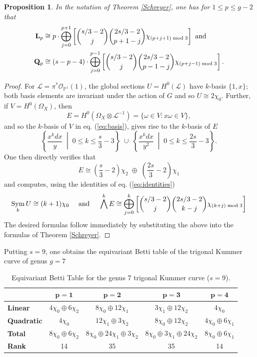 \documentclass[10pt]{amsart}
\newtheorem{proposition}[theorem]{Proposition}
\theoremstyle{definition}
\newcommand{\cO}{\mathcal{O}}
\DeclareMathOperator{\Sym}{Sym}
\begin{document}
\begin{proposition}
In the notation of Theorem \ref{Schreyer}, one has for $1\leq p \leq g-2$ that
\begin{align*}
\mathbf{L}_p &\cong p \cdot \bigoplus_{j=0}^{p+1} \left[ \binom{s/3-2}{j} \binom{2s/3-2}{p+1-j} \chi_{(p+j+1) \;{\rm mod}\; 3} \right]
\text{ and }\\
\mathbf{Q}_p &\cong (s-p-4) \cdot \bigoplus_{j=0}^{p-1} \left[ \binom{s/3-2}{j} \binom{2s/3-2}{p-1-j} \chi_{(p+j-1) \;{\rm mod}\; 3} \right].
\end{align*}
\end{proposition}
\begin{proof}
For $\mathcal{L}= \pi^* \cO_{\mathbb{P}^1}(1)$, the global sections $U=H^0(\mathcal{L})$ have $k$-basis $\{1,x\}$; both basis elements are invariant under the action of $G$ and so $U\cong 2\chi_0$. Further, if $V=H^0(\Omega_X)$, then 
\[
E=H^0(\Omega_X\otimes\mathcal{L}^{-1})=\{\omega\in V:x\omega\in V\},
\]
and so the $k$-basis of $V$ in eq. (\ref{eq:basis}), gives rise to the $k$-basis of $E$
\[
 \left\{ \frac{x^k dx}{y} \;\middle|\; 0 \le k \le \frac{s}{3}-3 \right\} \;\cup\; \left\{ \frac{x^k dx}{y^2} \;\middle|\; 0 \le k \le \frac{2s}{3}-3 \right\}.
\]
One then directly verifies that 
\[
E \cong \left(\frac{s}{3}-2\right)\chi_2 \;\oplus\; \left(\frac{2s}{3}-2\right)\chi_1
\]
 and computes, using the identities of eq. (\ref{eq:identities})
\[
\Sym_k U\cong  (k+1)\chi_0\quad\text{ and }\quad
\bigwedge^k E \cong \bigoplus_{j=0}^{k} \left[ \binom{s/3-2}{j} \binom{2s/3-2}{k-j} \chi_{(k+j) \;{\rm mod}\; 3} \right]
\]
The desired formulas follow immediately by substituting the above into the formulas of Theorem \ref{Schreyer}.

\end{proof}
Putting $s=9$, one obtains the equivariant Betti table of the trigonal Kummer curve of genus $g=7$

\begin{table}[h]
\centering
\renewcommand{\arraystretch}{1.5}
\begin{tabular}{|l|c|c|c|c|}
\hline
& $\mathbf{p=1}$ & $\mathbf{p=2}$ & $\mathbf{p=3}$ & $\mathbf{p=4}$ \\ \hline
\textbf{Linear}
& $4\chi_0 \oplus 6\chi_2$ 
& $8\chi_0 \oplus 12\chi_1$ 
& $3\chi_1 \oplus 12\chi_2$ 
& $4\chi_0$ \\ \hline
\textbf{Quadratic}
& $4\chi_0$ 
& $12\chi_1 \oplus 3\chi_2$ 
& $8\chi_0 \oplus 12\chi_2$ 
& $4\chi_0 \oplus 6\chi_1$ \\ \hline
\textbf{Total}
& $8\chi_0 \oplus 6\chi_2$ 
& $8\chi_0 \oplus 24\chi_1 \oplus 3\chi_2$ 
& $8\chi_0 \oplus 3\chi_1 \oplus 24\chi_2$ 
& $8\chi_0 \oplus 6\chi_1$ \\ \hline
\textbf{Rank} & 14 & 35 & 35 & 14 \\ \hline
\end{tabular}
\caption{Equivariant Betti Table for the genus 7 trigonal Kummer curve ($s=9$).}
\end{table}
\end{document}
